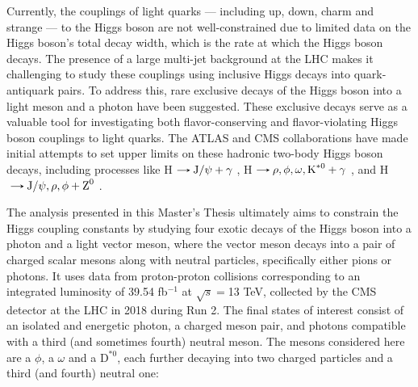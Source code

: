 Currently, the couplings of light quarks --- including up, down, charm and strange --- to the Higgs boson are not well-constrained due to limited data on the Higgs boson's total decay width, which is the rate at which the Higgs boson decays. The presence of a large multi-jet background at the LHC makes it challenging to study these couplings using inclusive Higgs decays into quark-antiquark pairs. To address this, rare exclusive decays of the Higgs boson into a light meson and a photon have been suggested. These exclusive decays serve as a valuable tool for investigating both flavor-conserving and flavor-violating Higgs boson couplings to light quarks. The ATLAS and CMS collaborations have made initial attempts to set upper limits on these hadronic two-body Higgs boson decays, including processes like H$\decaysto \text{J}/\psi + \gamma$ \cite{ATLAS:2022rej, CMS:2018gcm}, H$\decaysto \rho,\phi,\omega,\text{K}^{*0} + \gamma$ \cite{ATLAS:2017gko, ATLAS:2023alf}, and H$\decaysto \text{J}/\psi,\rho,\phi + \text{Z}^0$ \cite{CMS:2022fsq, CMS:2020ggo}.

The analysis presented in this Master's Thesis ultimately aims to constrain the Higgs coupling constants by studying four exotic decays of the Higgs boson into a photon and a light vector meson, where the vector meson decays into a pair of charged scalar mesons along with neutral particles, specifically either pions or photons. It uses data from proton-proton collisions corresponding to an integrated luminosity of 39.54 fb$^{-1}$ at $\sqrt{s}=$13 TeV, collected by the CMS detector at the LHC in 2018 during Run 2. The final states of interest consist of an isolated and energetic photon, a charged meson pair, and photons compatible with a third (and sometimes fourth) neutral meson. The mesons considered here are a $\phi$, a $\omega$ and a $\text{D}^{*0}$, each further decaying into two charged particles and a third (and fourth) neutral one:

